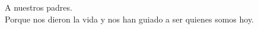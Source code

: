\pagebreak


\vspace*{8cm} 
\begin{center} 
\large A nuestros padres.\\ Porque nos dieron la vida y nos han guiado 
a ser quienes somos hoy.
\end{center}
\newpage
